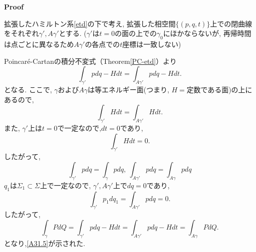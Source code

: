 \documentclass[a4paper]{ujarticle}
\makeatletter
\numberwithin{equation}{section}
\theoremstyle{definition}
\renewenvironment{proof}[1][Proof]{\par
  \pushQED{\qed}%
  \normalfont \topsep6\p@\@plus6\p@\relax
  \trivlist
  \item\relax
  {\bfseries
  #1\@addpunct{.}}\hspace\labelsep\ignorespaces
}{%
  \popQED\endtrivlist\@endpefalse
}
\makeatother
\begin{document}
    \begin{proof}
        拡張したハミルトン系\eqref{etd}の下で考え, 
        拡張した相空間$\{(p, q, t)\}$上での閉曲線をそれぞれ$\gamma', A\gamma'$とする.
        ($\gamma'$は$t = 0$の面の上での$\gamma_0$にほかならないが, 
        再帰時間は点ごとに異なるため$A \gamma'$の各点での$t$座標は一致しない)

        Poincar\'{e}-Cartanの積分不変式（Theorem\ref{PC-etd}）より
        \begin{equation}
            \int_{\gamma'} p dq - H dt = \int_{A \gamma'} p dq - H dt.
        \end{equation}
        となる.
        ここで, $\gamma$および$A\gamma$は等エネルギー面(つまり, $H = $定数である面)の上にあるので,
        \begin{equation}
            \int_{\gamma'} H dt = \int_{A \gamma'} H dt.
        \end{equation}
        また, $\gamma'$上は$t = 0$で一定なので,$dt = 0$であり,
        \begin{equation}
            \int_{\gamma'} H dt = 0.
        \end{equation}
        したがって, 
        \[
            \int_{\gamma'} p dq = \int_{\gamma} p dq, \ \int_{A \gamma'} p dq = \int_{A \gamma} p dq
        \]
        $q_1$は$\Sigma_1 \subset \Sigma$上で一定なので, $\gamma', A \gamma'$上で$dq = 0$であり, 
        \[
            \int_{\gamma'} p_1 dq_1 = \int_{A \gamma'} p dq = 0.
        \]
        したがって,
        \[
            \int_{\gamma} P dQ = \int_{\gamma'} p dq - H dt = \int_{A \gamma'} p dq - H dt = \int_{A \gamma} P dQ.
        \]
        となり,\eqref{A31.5}が示された.

    \end{proof}
\end{document}

